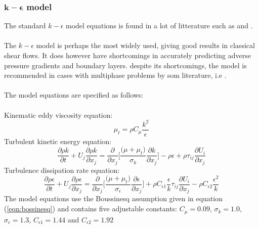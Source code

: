 \documentclass[a4paper, 12pt]{report}
\begin{document}
\subsubsection{$\boldsymbol{k}-\boldsymbol{\epsilon}$ model}
The standard $k-\epsilon$ model equations is found in a lot of litterature such as \cite{CFD} and \cite{UNIK4900}.\\
\\
The $k-\epsilon$ model is perhaps the most widely used, giving good results in classical shear flows. It does however have shortcomings in accurately predicting adverse pressure gradients and boundary layers. despite its shortcomings, the model is recommended in cases with multiphase problems by som literature, i.e \cite{AppliedMathematicalModelling}.\\
\\ 
The model equations are specified as follows:\\
\\
Kinematic eddy viscosity equation:
\begin{equation}
\mu_t = \rho C_{\mu}\frac{k^2}{\epsilon}
\label{eqn:nutKEpsilon}
\end{equation}
Turbulent kinetic energy equation:
\begin{equation}
\frac{\partial \rho k}{\partial t} + U_j \frac{\partial \rho k}{\partial x_j} = \frac{\partial}{\partial x_j}\Big[\frac{\big( \mu + \mu_t\big)}{\sigma_k}\frac{\partial k}{\partial x_j}\Big] - \rho \epsilon + \rho\tau_{ij}\frac{\partial U_i}{\partial x_j}
\label{eqn:kInKEpsilon}
\end{equation}
Turbulence dissipation rate equation:
\begin{equation}
\frac{\partial \rho \epsilon }{\partial t} + U_j\frac{\partial \rho \epsilon}{\partial x_j} =\frac{\partial }{\partial x_j}\Big[\frac{\big(\mu + \mu_t\big)}{\sigma_{\epsilon}}\frac{\partial \epsilon}{\partial x_j} \Big]  + \rho C_{\epsilon 1}\frac{\epsilon}{k}\tau_{ij}\frac{\partial U_i}{\partial x_j} - \rho C_{\epsilon 2} \frac{\epsilon ^2}{k}
\label{eqn:epsilonInKEpsilon}
\end{equation}
The model equations use the Boussinesq assumption given in equation (\ref{eqn:bossinesq}) and contains five adjustable constants: $C_{\mu}=0.09$, $\sigma_k=1.0$, $\sigma_{\epsilon}= 1.3$, $C_{\epsilon 1}=1.44$ and $C_{\epsilon 2}=1.92$
\end{document}
